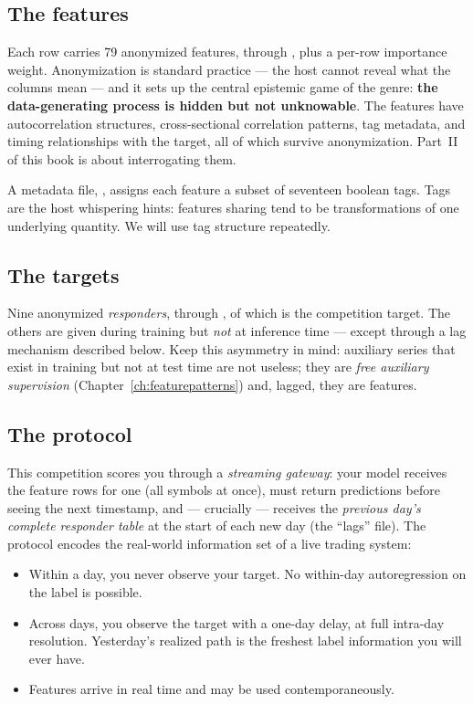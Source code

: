 \subsection{The features}

Each row carries 79 anonymized features,  through , plus a
per-row importance weight. Anonymization is standard practice --- the host
cannot reveal what the columns mean --- and it sets up the central epistemic
game of the genre: \textbf{the data-generating process is hidden but not
unknowable}. The features have autocorrelation structures, cross-sectional
correlation patterns, tag metadata, and timing relationships with the target,
all of which survive anonymization. Part~II of this book is about
interrogating them.

A metadata file, , assigns each feature a subset of
seventeen boolean tags. Tags are the host whispering hints: features sharing
 tend to be transformations of one underlying quantity.
We will use tag structure repeatedly.

\subsection{The targets}

Nine anonymized \emph{responders},  through , of which
 is the competition target. The others are given during training but
\emph{not} at inference time --- except through a lag mechanism described
below. Keep this asymmetry in mind: auxiliary series that exist in training
but not at test time are not useless; they are \emph{free auxiliary
supervision} (Chapter~\ref{ch:featurepatterns}) and, lagged, they are
features.

\subsection{The protocol}

This competition scores you through a \emph{streaming gateway}: your model
receives the feature rows for one  (all symbols at once), must
return predictions before seeing the next timestamp, and --- crucially ---
receives the \emph{previous day's complete responder table} at the start of
each new day (the ``lags'' file). The protocol encodes the real-world
information set of a live trading system:

\begin{itemize}
\item Within a day, you never observe your target. No within-day
  autoregression on the label is possible.
\item Across days, you observe the target with a one-day delay, at full
  intra-day resolution. Yesterday's realized path is the freshest label
  information you will ever have.
\item Features arrive in real time and may be used contemporaneously.
\end{itemize}

